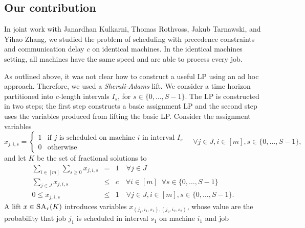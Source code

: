 \subsection{Our contribution}


In joint work with Janardhan Kulkarni, Thomas Rothvoss, Jakub Tarnawski, and Yihao Zhang, we studied the problem 
of scheduling with 
precedence constraints and communication delay $c$ on identical machines. 
In the identical machines setting, all machines have the same speed and are able to process every job. 

As outlined above, it was not clear how to construct a useful LP using an ad hoc approach.
Therefore, we used a \emph{Sherali-Adams} lift.
We consider a time horizon partitioned into $c$-length intervals $I_s$, for $s \in \{0,\ldots,S-1\}$.
The LP is constructed in two steps; the first step constructs a basic assignment LP and the second step uses the variables produced from lifting the basic LP. %
Consider the assignment variables
\[
  x_{j,i,s} = \begin{cases} 1 & \textrm{if }j\textrm{ is scheduled on machine }i\textrm{ in interval }I_s \\ 0 & \textrm{otherwise} \end{cases} \quad \forall j \in J, i \in [m], s \in \{ 0,\ldots,S-1\},
\]
and let $K$ be the set of fractional solutions to 
\begin{eqnarray*}
  \sum_{i \in [m]} \sum_{s \geq 0} x_{j,i,s} &=& 1 \quad \forall j \in J \\
  \sum_{j \in J} x_{j,i,s} &\leq& c \quad \forall i \in [m] \;\; \forall s \in \{ 0,\ldots,S-1\} \\
  0 \leq x_{j,i,s} &\leq& 1 \quad \forall j \in J, i \in [m], s \in \{ 0,\ldots,S-1\}.
\end{eqnarray*}
A lift $x \in \textsc{SA}_r(K)$ introduces variables $x_{(j_1,i_1,s_1),(j_2,i_2,s_2)}$, whose value are the probability that 
job $j_1$ is scheduled in interval $s_1$ on machine $i_1$ and job
